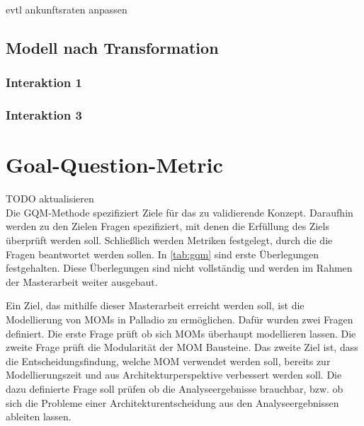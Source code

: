 evtl ankunftsraten anpassen

\subsection{Modell nach Transformation}
\subsubsection{Interaktion 1}

\subsubsection{Interaktion 3}
\section{Goal-Question-Metric}
TODO aktualisieren \\
Die GQM-Methode \cite{gqm} spezifiziert Ziele für das zu validierende Konzept. Daraufhin werden zu den Zielen Fragen spezifiziert, mit denen die Erfüllung des Ziels überprüft werden soll. Schließlich werden Metriken festgelegt, durch die die Fragen beantwortet werden sollen. In \autoref{tab:gqm} sind erste Überlegungen festgehalten. Diese Überlegungen sind nicht vollständig und werden im Rahmen der Masterarbeit weiter ausgebaut.\par
Ein Ziel, das mithilfe dieser Masterarbeit erreicht werden soll, ist die Modellierung von MOMs in Palladio zu ermöglichen. Dafür wurden zwei Fragen definiert. Die erste Frage prüft ob sich MOMs überhaupt modellieren lassen. Die zweite Frage prüft die Modularität der MOM Bausteine. Das zweite Ziel ist, dass die Entscheidungsfindung, welche MOM verwendet werden soll, bereits zur Modellierungszeit und aus Architekturperspektive verbessert werden soll. Die dazu definierte Frage soll prüfen ob die Analyseergebnisse brauchbar, bzw. ob sich die Probleme einer Architekturentscheidung aus den Analyseergebnissen ableiten lassen. 
